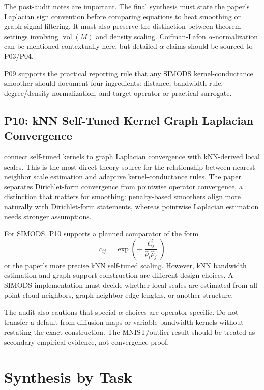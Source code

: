 \documentclass[11pt]{article}
\newcommand{\vol}{\operatorname{vol}}
\begin{document}
The post-audit notes are important.  The final synthesis must state the
paper's Laplacian sign convention before comparing equations to heat smoothing
or graph-signal filtering.  It must also preserve the distinction between
theorem settings involving \(\vol(M)\) and density scaling.  Coifman-Lafon
\(\alpha\)-normalization can be mentioned contextually here, but detailed
\(\alpha\) claims should be sourced to P03/P04.

P09 supports the practical reporting rule that any SIMODS kernel-conductance
smoother should document four ingredients: distance, bandwidth rule,
degree/density normalization, and target operator or practical surrogate.

\subsection{P10: kNN Self-Tuned Kernel Graph Laplacian Convergence}

\citet{cheng2022knn} connect self-tuned kernels to graph Laplacian convergence
with kNN-derived local scales.  This is the most direct theory source for the
relationship between nearest-neighbor scale estimation and adaptive
kernel-conductance rules.  The paper separates Dirichlet-form convergence from
pointwise operator convergence, a distinction that matters for smoothing:
penalty-based smoothers align more naturally with Dirichlet-form statements,
whereas pointwise Laplacian estimation needs stronger assumptions.

For SIMODS, P10 supports a planned comparator of the form
\[
  c_{ij}
  =
  \exp\!\left(
    -\frac{\ell_{ij}^2}{\widehat\rho_i\widehat\rho_j}
  \right)
\]
or the paper's more precise kNN self-tuned scaling.  However, kNN bandwidth
estimation and graph support construction are different design choices.  A
SIMODS implementation must decide whether local scales are estimated from all
point-cloud neighbors, graph-neighbor edge lengths, or another structure.

The audit also cautions that special \(\alpha\) choices are operator-specific.
Do not transfer a default from diffusion maps or variable-bandwidth kernels
without restating the exact construction.  The MNIST/outlier result should be
treated as secondary empirical evidence, not convergence proof.

\section{Synthesis by Task}
\end{document}
